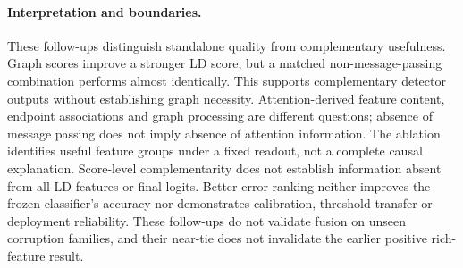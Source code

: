 \paragraph{Interpretation and boundaries.}
These follow-ups distinguish standalone quality from complementary
usefulness. Graph scores improve a stronger LD score, but a matched
non-message-passing combination performs almost identically. This
supports complementary detector outputs without establishing graph
necessity. Attention-derived feature content, endpoint associations and
graph processing are different questions; absence of message passing
does not imply absence of attention information. The ablation identifies
useful feature groups under a fixed readout, not a complete causal
explanation. Score-level complementarity does not establish information
absent from all LD features or final logits. Better error ranking neither
improves the frozen classifier's accuracy nor demonstrates calibration,
threshold transfer or deployment reliability. These follow-ups do not
validate fusion on unseen corruption families, and their near-tie does
not invalidate the earlier positive rich-feature result.




